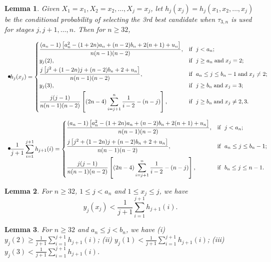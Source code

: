 \documentclass[12pt, A4paper, oneside]{article}
\theoremstyle{plain}
\newtheorem{lem}{Lemma}[section]
\numberwithin{equation}{section}
\begin{document}
\begin{lem}\label{sl4.4}
Given $X_1=x_1,X_2=x_2,\dots,X_j=x_j$, let $h_j(x_j)=h_j(x_1,x_2,\dots,x_j)$ be the conditional probability of selecting the 3rd best candidate when $\tau_{3,n}$ is used for stages $j,j+1,\dots,n$. Then for $n\ge32$,
\begin{itemize}
\item[\upshape(i)]
$$\hspace*{-4mm}
h_j(x_j)=
\begin{cases}
\displaystyle\frac{(a_n-1)\left[a_n^2-(1+2n)a_n+(n-2)b_n+2(n+1)+u_n\right]}{n(n-1)(n-2)},&\mathrm{if}\;\;j<a_n;\\
y_j(2),&\mathrm{if}\;\;j\ge a_n\;\mathrm{and}\;x_j=2;\\[1mm]
\displaystyle\frac{j\left[j^2+(1-2n)j+(n-2)b_n+2+u_n\right]}{n(n-1)(n-2)},&\mathrm{if}\;\;a_n\le j\le b_n-1\;\mathrm{and}\;x_j\neq 2;\\
y_j(3),&\mathrm{if}\;\;j\ge b_n\;\mathrm{and}\;x_j=3;\\[1mm]
\displaystyle\frac{j(j-1)}{n(n-1)(n-2)}\left[(2n-4)\sum_{i=j+1}^{n}\frac{1}{i-2}-(n-j)\right],&\mathrm{if}\;\;j\ge b_n\;\mathrm{and}\;x_j\neq 2,3.
\end{cases}
$$
\item[\upshape(ii)]
$$\hspace*{-4mm}
\frac{1}{j+1}\sum_{i=1}^{j+1}h_{j+1}(i)=
\begin{cases}
\displaystyle\frac{(a_n-1)\left[a_n^2-(1+2n)a_n+(n-2)b_n+2(n+1)+u_n\right]}{n(n-1)(n-2)},&\mathrm{if}\;\;j<a_n;\\[4mm]
\displaystyle\frac{j\left[j^2+(1-2n)j+(n-2)b_n+2+u_n\right]}{n(n-1)(n-2)},&\mathrm{if}\;\;a_n\le j\le b_n-1;\\[4mm]
\displaystyle\frac{j(j-1)}{n(n-1)(n-2)}\left[(2n-4)\sum_{i=j+1}^{n}\frac{1}{i-2}-(n-j)\right],&\mathrm{if}\;\;b_n\le j\le n-1.
\end{cases}
$$
\end{itemize}
\end{lem}

\begin{lem}\label{sl4.5}
For $n\ge32$, $1\le j<a_n$ and $1\le x_j\le j$, we have
\begin{equation*}
y_j(x_j)<\frac{1}{j+1}\sum_{i=1}^{j+1}h_{j+1}(i).
\end{equation*}
\end{lem}


\begin{lem}\label{sl4.6}
For $n\ge32$ and $a_n\le j<b_n$, we have
\upshape(i) $y_j(2)\ge\frac{1}{j+1}\sum_{i=1}^{j+1}h_{j+1}(i)$;
\upshape(ii) $y_j(1)<\frac{1}{j+1}\sum_{i=1}^{j+1}h_{j+1}(i)$;
\upshape(iii) $y_j(3)<\frac{1}{j+1}\sum_{i=1}^{j+1}h_{j+1}(i)$.
\end{lem}
\end{document}
